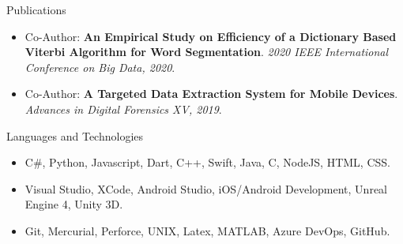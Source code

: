 \documentclass[]{mcdowellcv}
\begin{document}
	\begin{cvsection}{Publications}
		\begin{cvsubsection}{}{}{}	
			\begin{itemize}
				\item Co-Author: \textbf{An Empirical Study on Efficiency of a Dictionary Based Viterbi Algorithm for Word Segmentation}. \textit{2020 IEEE International Conference on Big Data, 2020}.
				\item Co-Author: \textbf{A Targeted Data Extraction System for Mobile Devices}. \textit{Advances in Digital Forensics XV, 2019}.
			\end{itemize}
		\end{cvsubsection}
	\end{cvsection}
	
	\begin{cvsection}{Languages and Technologies}
		\begin{cvsubsection}{}{}{}	
			\begin{itemize}
				\item C\#, Python, Javascript, Dart, C++, Swift, Java, C, NodeJS, HTML, CSS.
				\item Visual Studio, XCode, Android Studio, iOS/Android Development, Unreal Engine 4, Unity 3D.
				\item Git, Mercurial, Perforce, UNIX, Latex, MATLAB, Azure DevOps, GitHub.
			\end{itemize}
		\end{cvsubsection}
	\end{cvsection}
	
\end{document}
